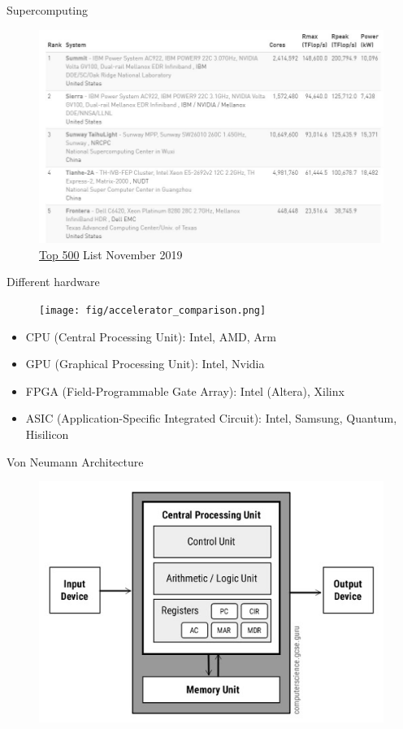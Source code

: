 \documentclass{../TexTemplate/myslide}
\begin{document}
\begin{frame}{Supercomputing}
\begin{figure}[H]
\centering
\includegraphics[width=0.8\linewidth]{fig/top500.jpg}
\caption*{\href{https://www.top500.org/lists/2019/11/}{Top 500} List November 2019}
\end{figure}
\end{frame}

\begin{frame}{Different hardware}
\begin{figure}[H]
\centering
\texttt{[image: fig/accelerator\_comparison.png]}
\end{figure}
\begin{itemize}
	\item CPU (Central Processing Unit): Intel, AMD, Arm
	\item GPU (Graphical Processing Unit): Intel, Nvidia
	\item FPGA (Field-Programmable Gate Array): Intel (Altera), Xilinx
	\item ASIC (Application-Specific Integrated Circuit): Intel, Samsung, Quantum, Hisilicon
\end{itemize}
\end{frame}

\begin{frame}{Von Neumann Architecture}
\begin{figure}
\centering
\includegraphics[width=0.6\linewidth]{fig/von-neumann.jpg}
\end{figure}
\end{frame}
\end{document}
